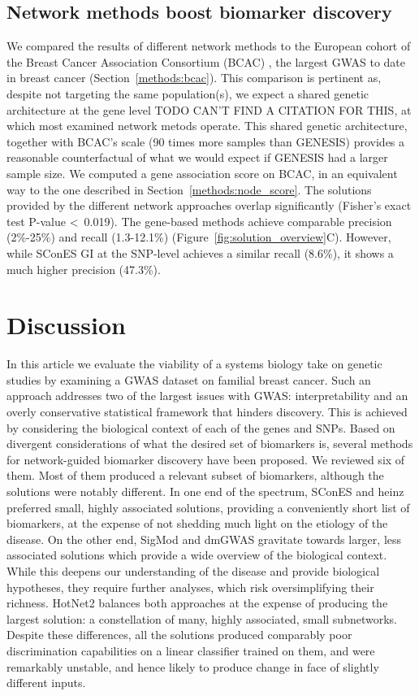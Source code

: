\documentclass[twocolumn, 11pt]{article}
\begin{document}
\subsection{Network methods boost biomarker discovery}

We compared the results of different network methods to the European cohort of the Breast Cancer Association Consortium (BCAC) \cite{Michailidou2017}, the largest GWAS to date in breast cancer (Section~\ref{methods:bcac}). This comparison is pertinent as, despite not targeting the same population(s), we expect a shared genetic architecture at the gene level %
TODO CAN'T FIND A CITATION FOR THIS, at which most examined network metods operate. This shared genetic architecture, together with BCAC's scale (90 times more samples than GENESIS) provides a reasonable counterfactual of what we would expect if GENESIS had a larger sample size. We computed a gene association score on BCAC, in an equivalent way to the one described in Section~\ref{methods:node_score}. The solutions provided by the different network approaches overlap significantly (Fisher's exact test P-value \textless~0.019). The gene-based methods achieve comparable precision (2\%-25\%) and recall (1.3-12.1\%) (Figure~\ref{fig:solution_overview}C). However, while SConES GI at the SNP-level achieves a similar recall (8.6\%), it shows a much higher precision (47.3\%).

\section{Discussion}

In this article we evaluate the viability of a systems biology take on genetic studies by examining a GWAS dataset on familial breast cancer. Such an approach addresses two of the largest issues with GWAS: interpretability and an overly conservative statistical framework that hinders discovery. This is achieved by considering the biological context of each of the genes and SNPs. Based on divergent considerations of what the desired set of biomarkers is, several methods for network-guided biomarker discovery have been proposed. We reviewed six of them. Most of them produced a relevant subset of biomarkers, although the solutions were notably different. In one end of the spectrum, SConES and heinz preferred small, highly associated solutions, providing a conveniently short list of biomarkers, at the expense of not shedding much light on the etiology of the disease. On the other end, SigMod and dmGWAS gravitate towards larger, less associated solutions which provide a wide overview of the biological context. While this deepens our understanding of the disease and provide biological hypotheses, they require further analyses, which risk oversimplifying their richness. HotNet2 balances both approaches at the expense of producing the largest solution: a constellation of many, highly associated, small subnetworks. Despite these differences, all the solutions produced comparably poor discrimination capabilities on a linear classifier trained on them, and were remarkably unstable, and hence likely to produce change in face of slightly different inputs.
\end{document}
